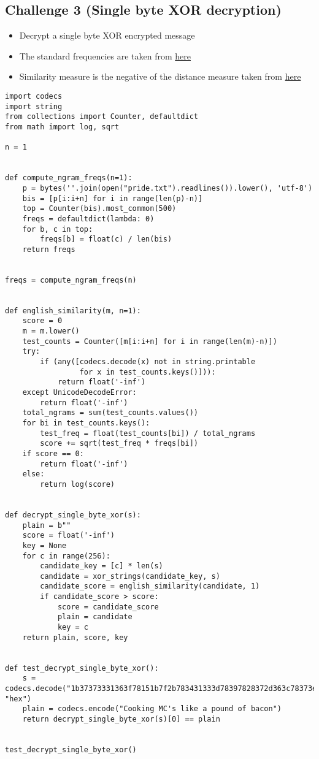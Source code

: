 \documentclass[11pt]{article}
\begin{document}
\subsection{Challenge 3 (Single byte XOR decryption)}
\label{sec:org10ffa53}
\begin{itemize}
\item Decrypt a single byte XOR encrypted message
\item The standard frequencies are taken from \href{https://www.wikiwand.com/en/Letter\_frequency\#/Relative\_frequencies\_of\_letters\_in\_the\_English\_language}{here}
\item Similarity measure is the negative of the distance measure taken from \href{https://www.wikiwand.com/en/Bhattacharyya\_distance}{here}
\end{itemize}
\begin{verbatim}
import codecs
import string
from collections import Counter, defaultdict
from math import log, sqrt

n = 1


def compute_ngram_freqs(n=1):
    p = bytes(''.join(open("pride.txt").readlines()).lower(), 'utf-8')
    bis = [p[i:i+n] for i in range(len(p)-n)]
    top = Counter(bis).most_common(500)
    freqs = defaultdict(lambda: 0)
    for b, c in top:
        freqs[b] = float(c) / len(bis)
    return freqs


freqs = compute_ngram_freqs(n)


def english_similarity(m, n=1):
    score = 0
    m = m.lower()
    test_counts = Counter([m[i:i+n] for i in range(len(m)-n)])
    try:
        if (any([codecs.decode(x) not in string.printable
                 for x in test_counts.keys()])):
            return float('-inf')
    except UnicodeDecodeError:
        return float('-inf')
    total_ngrams = sum(test_counts.values())
    for bi in test_counts.keys():
        test_freq = float(test_counts[bi]) / total_ngrams
        score += sqrt(test_freq * freqs[bi])
    if score == 0:
        return float('-inf')
    else:
        return log(score)


def decrypt_single_byte_xor(s):
    plain = b""
    score = float('-inf')
    key = None
    for c in range(256):
        candidate_key = [c] * len(s)
        candidate = xor_strings(candidate_key, s)
        candidate_score = english_similarity(candidate, 1)
        if candidate_score > score:
            score = candidate_score
            plain = candidate
            key = c
    return plain, score, key


def test_decrypt_single_byte_xor():
    s = codecs.decode("1b37373331363f78151b7f2b783431333d78397828372d363c78373e783a393b3736", "hex")
    plain = codecs.encode("Cooking MC's like a pound of bacon")
    return decrypt_single_byte_xor(s)[0] == plain


test_decrypt_single_byte_xor()
\end{verbatim}
\end{document}
